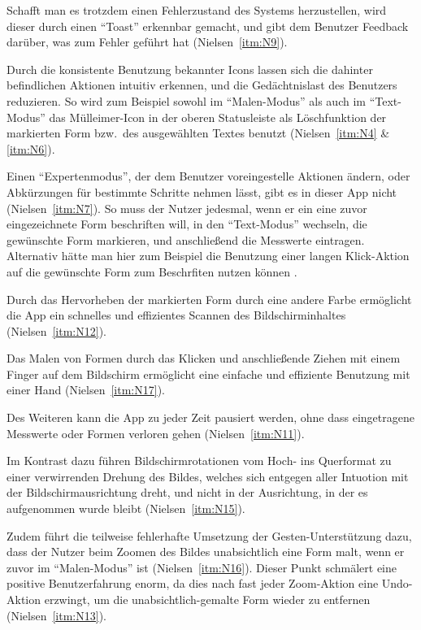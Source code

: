 Schafft man es trotzdem einen Fehlerzustand des Systems herzustellen, wird dieser durch einen ``Toast''  erkennbar gemacht, und gibt dem Benutzer Feedback darüber, was zum Fehler geführt hat  (Nielsen~\autoref{itm:N9}).

Durch die konsistente Benutzung bekannter Icons lassen sich die dahinter befindlichen Aktionen intuitiv erkennen, und die Gedächtnislast des Benutzers reduzieren. 
So wird zum Beispiel sowohl im ``Malen-Modus'' als auch im ``Text-Modus'' das Mülleimer-Icon in der oberen Statusleiste als Löschfunktion der markierten Form bzw.\ des ausgewählten Textes benutzt (Nielsen~\autoref{itm:N4} \& \autoref{itm:N6}).

Einen ``Expertenmodus'', der dem Benutzer voreingestelle Aktionen ändern, oder Abkürzungen für bestimmte Schritte nehmen lässt, gibt es in dieser App nicht (Nielsen~\autoref{itm:N7}).
So muss der Nutzer jedesmal, wenn er ein eine zuvor eingezeichnete Form beschriften will, in den ``Text-Modus'' wechseln, die gewünschte Form markieren, und anschließend die Messwerte eintragen. 
Alternativ hätte man hier zum Beispiel die Benutzung einer langen Klick-Aktion auf die gewünschte Form zum Beschrfiten nutzen können .

Durch das Hervorheben der markierten Form durch eine andere Farbe ermöglicht die App ein schnelles und effizientes Scannen des Bildschirminhaltes (Nielsen~\autoref{itm:N12}).

Das Malen von Formen durch das Klicken und anschließende Ziehen mit einem Finger auf dem Bildschirm ermöglicht eine einfache und effiziente Benutzung mit einer Hand (Nielsen~\autoref{itm:N17}).

Des Weiteren kann die App zu jeder Zeit pausiert werden, ohne dass eingetragene Messwerte oder Formen verloren gehen (Nielsen~\autoref{itm:N11}).

Im Kontrast dazu führen Bildschirmrotationen vom Hoch- ins Querformat zu einer verwirrenden Drehung des Bildes, welches sich entgegen aller Intuotion mit der Bildschirmausrichtung dreht, und nicht in der Ausrichtung, in der es aufgenommen wurde bleibt (Nielsen~\autoref{itm:N15}).

Zudem führt die teilweise fehlerhafte Umsetzung der Gesten-Unterstützung dazu, dass der Nutzer beim Zoomen des Bildes unabsichtlich eine Form malt, wenn er zuvor im ``Malen-Modus'' ist (Nielsen~\autoref{itm:N16}).
Dieser Punkt schmälert eine positive Benutzerfahrung enorm, da dies nach fast jeder Zoom-Aktion eine Undo-Aktion erzwingt, um die unabsichtlich-gemalte Form wieder zu entfernen (Nielsen~\autoref{itm:N13}).

